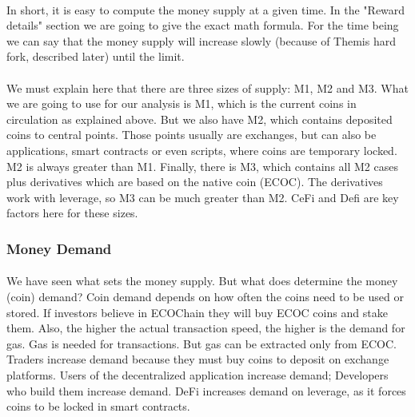 \documentclass{article}
\begin{document}
\paragraph{}
In short, it is easy to compute the money supply at a given time. In the "Reward details" section we are going to give the exact math formula. For the time being we can say that the money supply will increase slowly (because of Themis hard fork, described later) until the limit.
\paragraph{}
We must explain here that there are three sizes of supply: M1, M2 and M3.
What we are going to use for our analysis is M1, which is the current coins in circulation as explained above. But we also have M2, which contains deposited coins to central points. Those points usually are exchanges, but can also be applications, smart contracts or even scripts, where coins are temporary locked. M2 is always greater than M1. Finally, there is M3, which contains all M2 cases plus derivatives which are based on the native coin (ECOC). The derivatives work with leverage, so M3 can be much greater than M2. CeFi and Defi are key factors here for these sizes.

\subsubsection{Money Demand}
\paragraph{}
We have seen what sets the money supply. But what does determine the money (coin) demand? Coin demand depends on how often the coins need to be used or stored. If investors believe in ECOChain they will buy ECOC coins and stake them. Also, the higher the actual transaction speed, the higher is the demand for gas. Gas is needed for transactions. But gas can be extracted only from ECOC. Traders increase demand because they must buy coins to deposit on exchange platforms. Users of the decentralized application increase demand; Developers who build them increase demand. DeFi increases demand on leverage, as it forces coins to be locked in smart contracts.
\end{document}
